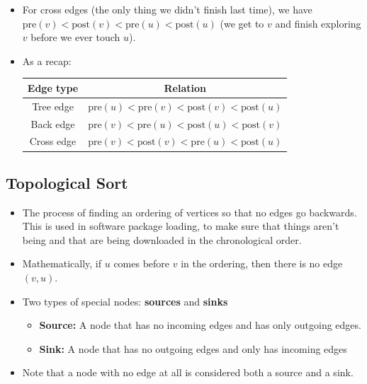 \documentclass[10pt]{article}
\newcommand{\pre}{\mathrm{pre}}
\newcommand{\post}{\mathrm{post}}
\begin{document}
	\begin{itemize}
		\item For cross edges (the only thing we didn't finish last time), we have $\pre(v) < \post(v) <
			\pre(u) < \post(u)$ (we get to $v$ and finish exploring $v$ before we ever touch $u$).
		\item As a recap:
			\begin{center}
				\begin{tabular}{c|c}
					Edge type & Relation\\
					\hline
					Tree edge & $\pre(u)< \pre(v) < \post(v) < \post(u)$\\
					Back edge & $\pre(v) < \pre(u) < \post(u) < \post(v)$\\
					Cross edge & $\pre(v) < \post(v) < \pre(u) < \post(u)$
				\end{tabular}
			\end{center}
	\end{itemize}


	\subsection{Topological Sort} 
	\begin{itemize}
		\item The process of finding an ordering of vertices so that no edges go backwards. This is used 
			in software package loading, to make sure that things aren't being and that are being downloaded
			in the chronological order. 
		\item Mathematically, if $u$ comes before $v$ in the ordering, then there is no edge $(v, u)$. 
		\item Two types of special nodes: \textbf{sources} and \textbf{sinks}
			\begin{itemize}
				\item \textbf{Source:} A node that has no incoming edges and has only outgoing edges. 
				\item \textbf{Sink:} A node that has no outgoing edges and only has incoming edges
			\end{itemize}
		\item Note that a node with no edge at all is considered both a source and a sink.
	\end{itemize}
	
\end{document}
